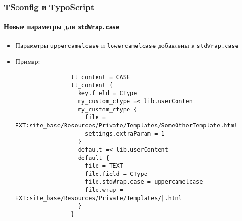 \begin{frame}[fragile]
	\frametitle{TSconfig и TypoScript}
	\framesubtitle{Новые параметры для \texttt{stdWrap.case}}

	\lstset{basicstyle=\tiny\ttfamily}

	\begin{itemize}

		\item Параметры \texttt{uppercamelcase} и \texttt{lowercamelcase} добавлены 
			к \texttt{stdWrap.case}

		\item Пример:

			\begin{lstlisting}
				tt_content = CASE
				tt_content {
				  key.field = CType
				  my_custom_ctype =< lib.userContent
				  my_custom_ctype {
				    file = EXT:site_base/Resources/Private/Templates/SomeOtherTemplate.html
				    settings.extraParam = 1
				  }
				  default =< lib.userContent
				  default {
				    file = TEXT
				    file.field = CType
				    file.stdWrap.case = uppercamelcase
				    file.wrap = EXT:site_base/Resources/Private/Templates/|.html
				  }
				}
			\end{lstlisting}

	\end{itemize}

\end{frame}


